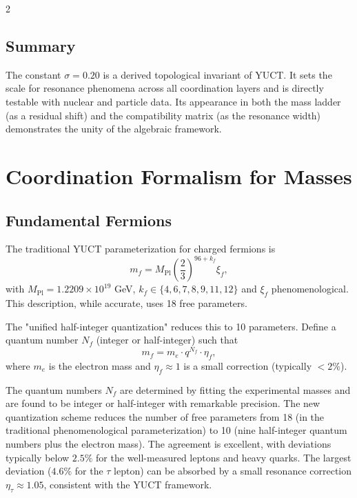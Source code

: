 \documentclass[11pt,a4paper]{article}
\begin{document}
\begin{multicols}{2}
\subsection{Summary}
The constant $\sigma = 0.20$ is a derived topological invariant of YUCT. It sets the scale for resonance phenomena across all coordination layers and is directly testable with nuclear and particle data. Its appearance in both the mass ladder (as a residual shift) and the compatibility matrix (as the resonance width) demonstrates the unity of the algebraic framework.

		\section{Coordination Formalism for Masses}
		\label{sec:formalism}
		
		\subsection{Fundamental Fermions}
		
		The traditional YUCT parameterization for charged fermions is
		\begin{equation}
			m_f = M_{\mathrm{Pl}} \left( \frac{2}{3} \right)^{96 + k_f} \xi_f,
			\label{eq:mass_fermion}
		\end{equation}
		with \(M_{\mathrm{Pl}} = 1.2209\times 10^{19}\) GeV, \(k_f \in \{4,6,7,8,9,11,12\}\) and \(\xi_f\) phenomenological. This description, while accurate, uses 18 free parameters.
		
		The "unified half-integer quantization" reduces this to 10 parameters. Define a quantum number \(N_f\) (integer or half-integer) such that
		\begin{equation}
			m_f = m_e \cdot q^{N_f} \cdot \eta_f,
			\label{eq:mass_quantized}
		\end{equation}
		where \(m_e\) is the electron mass and \(\eta_f \approx 1\) is a small correction (typically \(<2\%\)). 
		
		The quantum numbers \(N_f\) are determined by fitting the experimental masses and are found to be integer or half-integer with remarkable precision. 
		The new quantization scheme reduces the number of free parameters from 18 (in the traditional phenomenological parameterization) to 10 (nine half-integer quantum numbers plus the electron mass). 
		The agreement is excellent, with deviations typically below \(2.5\%\) for the well-measured leptons and heavy quarks. 
		The largest deviation (\(4.6\%\) for the \(\tau\) lepton) can be absorbed by a small resonance correction \(\eta_\tau \approx 1.05\), consistent with the YUCT framework.
		

\end{multicols}
\end{document}
